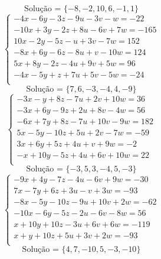 \documentclass[12pt,oneside,a4paper]{article}
\begin{document}
\begin{equation*}
\text{Solução = }\{-8,-2,10,6,-1,1\}
\end{equation*}
\vspace{\baselineskip}
\begin{equation*}
\begin{cases}
-4x-6y-3z-9u-3v-w=-22 \\
-10x+3y-2z+8u-6v+7w=-165 \\
10x-2y-5z-u+3v-7w=152 \\
-8x+6y-6z-8u+v-10w=124 \\
5x+8y-2z-4u+9v+5w=96 \\
-4x-5y+z+7u+5v-5w=-24 \\
\end{cases}
\end{equation*}
\begin{equation*}
\text{Solução = }\{7,6,-3,-4,4,-9\}
\end{equation*}
\vspace{\baselineskip}
\begin{equation*}
\begin{cases}
-3x-y+8z-7u+2v+10w=36 \\
-3x+6y-9z+2u+8v-4w=56 \\
-6x+7y+8z-7u+10v-9w=182 \\
5x-5y-10z+5u+2v-7w=-59 \\
3x+6y+5z+4u+v+9w=-2 \\
-x+10y-5z+4u+6v+10w=22 \\
\end{cases}
\end{equation*}
\begin{equation*}
\text{Solução = }\{-3,5,3,-4,5,-3\}
\end{equation*}
\vspace{\baselineskip}
\begin{equation*}
\begin{cases}
-9x+4y-7z-4u-6v+9w=-30 \\
7x-7y+6z+3u-v+3w=-93 \\
-8x-5y-10z-9u+10v+2w=-62 \\
-10x-6y-5z-2u-6v-8w=56 \\
x+10y+10z-3u+6v+6w=-119 \\
x+y+10z+5u+3v+2w=-93 \\
\end{cases}
\end{equation*}
\begin{equation*}
\text{Solução = }\{4,7,-10,5,-3,-10\}
\end{equation*}
\end{document}
